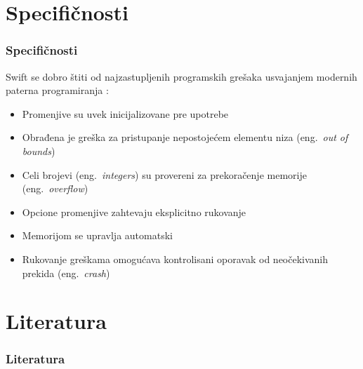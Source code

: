 \documentclass{beamer}
\begin{document}
\section{Specifičnosti}
\begin{frame}
\frametitle{Specifičnosti}

Swift se dobro štiti od najzastupljenih programskih grešaka usvajanjem modernih paterna programiranja \cite{swift_sajt}:
\begin{itemize}
\item Promenjive su uvek inicijalizovane pre upotrebe
\item Obrađena je greška za pristupanje nepostojećem elementu niza (eng.~{\em out of bounds})
\item Celi brojevi (eng.~{\em integers}) su provereni za prekoračenje memorije (eng.~{\em overflow})
\item Opcione promenjive zahtevaju eksplicitno rukovanje
\item Memorijom se upravlja automatski
\item Rukovanje greškama omogućava kontrolisani oporavak od neočekivanih prekida (eng.~{\em crash})
\end{itemize}

\end{frame}

\section{Literatura}

\begin{frame}
\frametitle{Literatura}



\end{frame}
\end{document}
